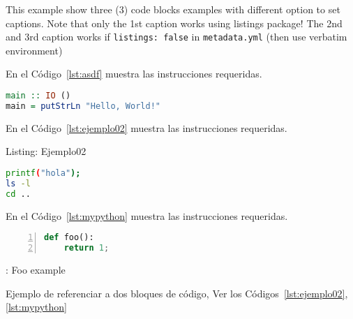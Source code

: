 \documentclass[
  spanish,
]{article}
\author{}
\date{}
\newcommand{\passthrough}[1]{#1}
\begin{document}
This example show three (3) code blocks examples with different option
to set captions. Note that only the 1st caption works using listings
package! The 2nd and 3rd caption works if
\passthrough{\lstinline!listings: false!} in
\passthrough{\lstinline!metadata.yml!} (then use verbatim environment)

En el Código~\ref{lst:asdf} muestra las instrucciones requeridas.

\begin{lstlisting}[language=Haskell, caption={este es el caption}, label=lst:asdf]
main :: IO ()
main = putStrLn "Hello, World!"
\end{lstlisting}

En el Código~\ref{lst:ejemplo02} muestra las instrucciones requeridas.

Listing: Ejemplo02

\begin{lstlisting}[language=bash, label=lst:ejemplo02]
printf("hola");
ls -l
cd ..
\end{lstlisting}

En el Código~\ref{lst:mypython} muestra las instrucciones requeridas.

\begin{lstlisting}[language=Python, numbers=left, label=lst:mypython]
def foo():
    return 1;
\end{lstlisting}

: Foo example

Ejemplo de referenciar a dos bloques de código, Ver los
Códigos~\ref{lst:ejemplo02}, \ref{lst:mypython}
\end{document}
